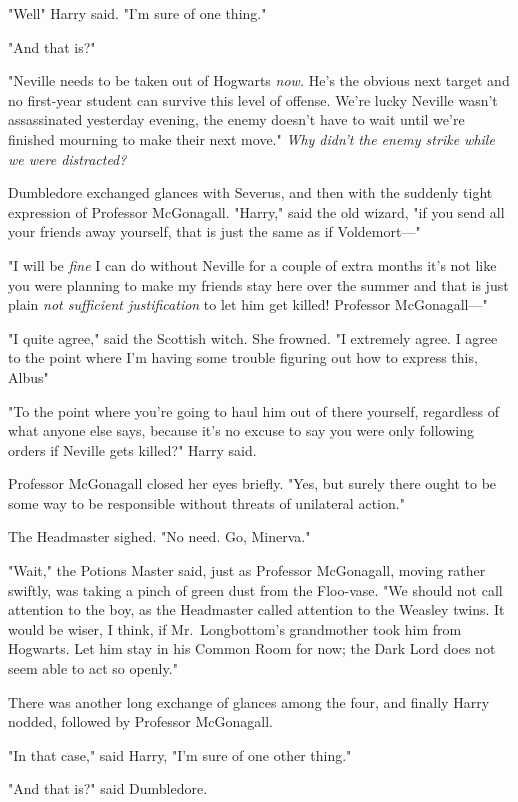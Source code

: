 "Well{\el}" Harry said. "I'm sure of one thing."

"And that is?"

"Neville needs to be taken out of Hogwarts \emph{now.} He's the obvious next
target and no first-year student can survive this level of offense. We're lucky
Neville wasn't assassinated yesterday evening, the enemy doesn't have to wait
until we're finished mourning to make their next move." \emph{Why didn't the
enemy strike while we were distracted?}

Dumbledore exchanged glances with Severus, and then with the suddenly tight
expression of Professor McGonagall. "Harry," said the old wizard, "if you send
all your friends away yourself, that is just the same as if Voldemort---"

"I will be \emph{fine} I can do without Neville for a couple of extra months
it's not like you were planning to make my friends stay here over the summer
and that is just plain \emph{not sufficient justification} to let him get
killed! Professor McGonagall---"

"I quite agree," said the Scottish witch. She frowned. "I extremely agree. I
agree to the point where{\el} I'm having some trouble figuring out how to
express this, Albus{\el}"

"To the point where you're going to haul him out of there yourself, regardless
of what anyone else says, because it's no excuse to say you were only following
orders if Neville gets killed?" Harry said.

Professor McGonagall closed her eyes briefly. "Yes, but surely there ought to
be some way to be responsible without threats of unilateral action."

The Headmaster sighed. "No need. Go, Minerva."

"Wait," the Potions Master said, just as Professor McGonagall, moving rather
swiftly, was taking a pinch of green dust from the Floo-vase. "We should not
call attention to the boy, as the Headmaster called attention to the Weasley
twins. It would be wiser, I think, if Mr.~Longbottom's grandmother took him
from Hogwarts. Let him stay in his Common Room for now; the Dark Lord does not
seem able to act so openly."

There was another long exchange of glances among the four, and finally Harry
nodded, followed by Professor McGonagall.

"In that case," said Harry, "I'm sure of one other thing."

"And that is?" said Dumbledore.


